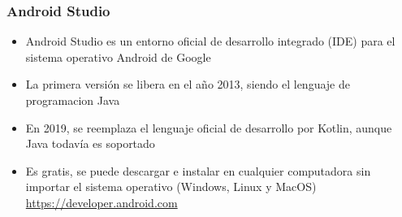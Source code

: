 
\begin{frame}
\frametitle{Android Studio}  

\begin{itemize}
\item Android Studio es un entorno oficial de desarrollo integrado (IDE) para el sistema operativo Android de Google
\item La primera versi\'on se libera en el año 2013, siendo el lenguaje de programacion Java
\item En 2019, se reemplaza el lenguaje oficial de desarrollo por Kotlin, aunque Java todav\'ia es soportado
\item Es gratis, se puede descargar e instalar en cualquier computadora sin importar el sistema operativo (Windows, Linux y MacOS)
\url{https://developer.android.com}
\end{itemize}
\end{frame}



